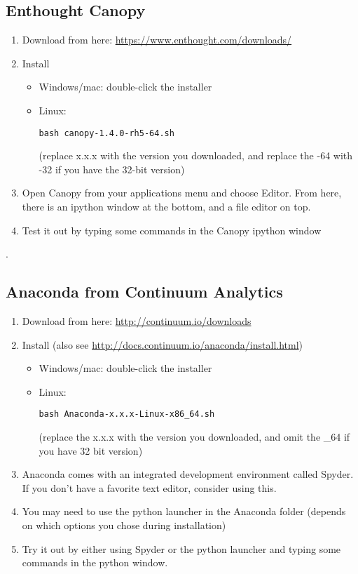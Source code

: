 \documentclass[11pt]{article}
\begin{document}
\subsection{Enthought Canopy}
\label{sec-1-1}
\begin{enumerate}
\item Download from here: \url{https://www.enthought.com/downloads/}
\item Install
\begin{itemize}
\item Windows/mac: double-click the installer
\item Linux: 
\begin{verbatim}
bash canopy-1.4.0-rh5-64.sh
\end{verbatim}
(replace x.x.x with the version you downloaded, and replace the -64 with -32 if you have the 32-bit version)
\end{itemize}
\item Open Canopy from your applications menu and choose Editor. From here, there is an ipython window at the bottom, and a file editor on top.
\item Test it out by typing some commands in the Canopy ipython window
\end{enumerate}
.

\subsection{Anaconda from Continuum Analytics}
\label{sec-1-2}
\begin{enumerate}
\item Download from here: \url{http://continuum.io/downloads}
\item Install (also see \url{http://docs.continuum.io/anaconda/install.html})
\begin{itemize}
\item Windows/mac: double-click the installer
\item Linux: 
\begin{verbatim}
bash Anaconda-x.x.x-Linux-x86_64.sh
\end{verbatim}
(replace the x.x.x with the version you downloaded, and omit the \_64 if you have 32 bit version)
\end{itemize}
\item Anaconda comes with an integrated development environment called Spyder. If you don't have a favorite text editor, consider using this.
\item You may need to use the python launcher in the Anaconda folder (depends on which options you chose during installation)
\item Try it out by either using Spyder or the python launcher and typing some commands in the python window.
\end{enumerate}
\end{document}

